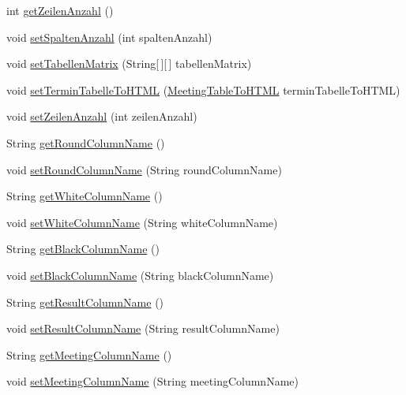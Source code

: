 \begin{DoxyCompactItemize}
\item 
int \hyperlink{classde_1_1turnierverwaltung_1_1model_1_1_meeting_table_a4877b51da219f28ba327260248ef18c9}{get\+Zeilen\+Anzahl} ()
\item 
void \hyperlink{classde_1_1turnierverwaltung_1_1model_1_1_meeting_table_acead72c19b38893d56011fbc8e8a3c05}{set\+Spalten\+Anzahl} (int spalten\+Anzahl)
\item 
void \hyperlink{classde_1_1turnierverwaltung_1_1model_1_1_meeting_table_a202b217257e15fb2c8398a32e99696da}{set\+Tabellen\+Matrix} (String\mbox{[}$\,$\mbox{]}\mbox{[}$\,$\mbox{]} tabellen\+Matrix)
\item 
void \hyperlink{classde_1_1turnierverwaltung_1_1model_1_1_meeting_table_adfc78541c989d9417b6459eee487d065}{set\+Termin\+Tabelle\+To\+H\+T\+ML} (\hyperlink{classde_1_1turnierverwaltung_1_1model_1_1_meeting_table_to_h_t_m_l}{Meeting\+Table\+To\+H\+T\+ML} termin\+Tabelle\+To\+H\+T\+ML)
\item 
void \hyperlink{classde_1_1turnierverwaltung_1_1model_1_1_meeting_table_ac49bf4729dd4012ab8667b9954399546}{set\+Zeilen\+Anzahl} (int zeilen\+Anzahl)
\item 
String \hyperlink{classde_1_1turnierverwaltung_1_1model_1_1_meeting_table_ab6d3af5ca56588334a36703bcdec87b2}{get\+Round\+Column\+Name} ()
\item 
void \hyperlink{classde_1_1turnierverwaltung_1_1model_1_1_meeting_table_a3bc76da2d3121ba1d39b1d2895d3e4a9}{set\+Round\+Column\+Name} (String round\+Column\+Name)
\item 
String \hyperlink{classde_1_1turnierverwaltung_1_1model_1_1_meeting_table_a825bea896e125c3a42eb8948c03792d8}{get\+White\+Column\+Name} ()
\item 
void \hyperlink{classde_1_1turnierverwaltung_1_1model_1_1_meeting_table_a13495592cd2a62501c9964b13db55837}{set\+White\+Column\+Name} (String white\+Column\+Name)
\item 
String \hyperlink{classde_1_1turnierverwaltung_1_1model_1_1_meeting_table_aa4a864747fa7d8ea4f4a7ffe31c171bb}{get\+Black\+Column\+Name} ()
\item 
void \hyperlink{classde_1_1turnierverwaltung_1_1model_1_1_meeting_table_aab4ba4358df64269a5617105ef90bd1d}{set\+Black\+Column\+Name} (String black\+Column\+Name)
\item 
String \hyperlink{classde_1_1turnierverwaltung_1_1model_1_1_meeting_table_a38dadedba0d438f44a7ad089c34dbb98}{get\+Result\+Column\+Name} ()
\item 
void \hyperlink{classde_1_1turnierverwaltung_1_1model_1_1_meeting_table_a8410097213a90853cdbbf12f234036a4}{set\+Result\+Column\+Name} (String result\+Column\+Name)
\item 
String \hyperlink{classde_1_1turnierverwaltung_1_1model_1_1_meeting_table_a27734d8688c91fa84cf2e7cdc761e5b5}{get\+Meeting\+Column\+Name} ()
\item 
void \hyperlink{classde_1_1turnierverwaltung_1_1model_1_1_meeting_table_a88802c39cc6b85929e21622230d6764e}{set\+Meeting\+Column\+Name} (String meeting\+Column\+Name)
\end{DoxyCompactItemize}


